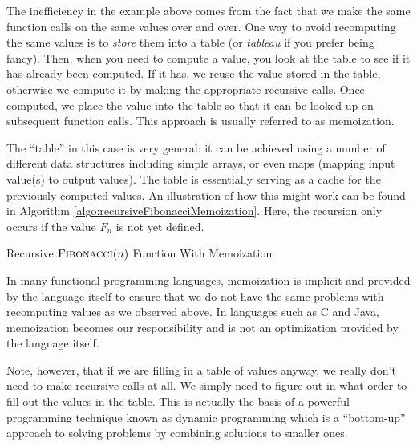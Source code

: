 The inefficiency in the example above comes from the fact that we make 
the same function calls on the same values over and over.  One way to
avoid recomputing the same values is to \emph{store} them into a table
(or \emph{tableau} if you prefer being fancy).  Then, when you need
to compute a value, you look at the table to see if it has already
been computed.  If it has, we reuse the value stored in the table, otherwise
we compute it by making the appropriate recursive calls.  Once computed,
we place the value into the table so that it can be looked up on subsequent
function calls.  This approach is usually referred to as \gls{memoization}.

The ``table'' in this case is very general: it can be achieved using 
a number of different data structures including simple arrays, or even
maps (mapping input value(s) to output values).  The table is essentially
serving as a \gls{cache} for the previously computed values. An 
illustration of how this might work can be found in Algorithm 
\ref{algo:recursiveFibonacciMemoization}.  Here, the recursion only
occurs if the value $F_n$ is not yet defined.

\begin{algorithm}[H]
 
\caption{Recursive $\textsc{Fibonacci}(n)$ Function With Memoization}
\label{algo:recursiveFibonacciMemoization}
\end{algorithm}

In many functional programming languages, memoization is implicit and
provided by the language itself to ensure that we do not have the same
problems with recomputing values as we observed above.  In languages
such as C and Java, memoization becomes our responsibility and is not
an optimization provided by the language itself.  

Note, however, that if we are filling in a table of values anyway, we
really don't need to make recursive calls at all.  We simply need to 
figure out in what order to fill out the values in the table.  This is
actually the basis of a powerful programming technique known as
\gls{dynamic programming} which is a ``bottom-up'' approach to solving
problems by combining solutions to smaller ones.


